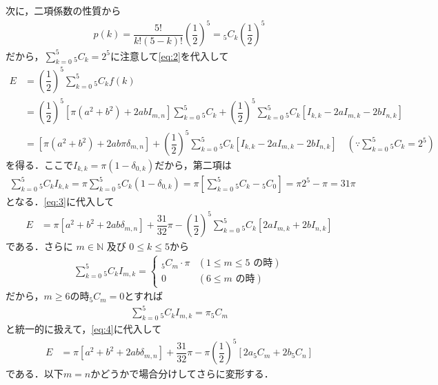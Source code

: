 \documentclass[../../main.tex]{subfiles}
\begin{document}
次に，二項係数の性質から
\begin{align}
  p(k)=\dfrac{5!}{k! (5-k)!} {\left( \dfrac{1}{2} \right)}^5  = {}_{5}C_{k}\left( \dfrac{1}{2} \right)^5
\end{align}
だから，$\sum_{k=0}^{5} {}_{5}C_{k}=2^5$に注意して\cref{eq:2}を代入して
\begin{align}
  E
  & = \left( \dfrac{1}{2} \right)^5 \sum_{k=0}^{5} {}_{5}C_{k} f(k) \\
  &= \left( \dfrac{1}{2} \right)^5 \left[\pi(a^2+b^2)+2ab I_{m,n}\right]\sum_{k=0}^{5} {}_{5}C_{k}
  + \left( \dfrac{1}{2} \right)^5 \sum_{k=0}^{5} {}_{5}C_{k}\left[I_{k,k}- 2a I_{m,k} - 2b I_{n,k}\right] \\
  &= \left[\pi(a^2+b^2)+2ab\pi \delta_{m,n} \right]
  + \left( \dfrac{1}{2} \right)^5 \sum_{k=0}^{5} {}_{5}C_{k}\left[I_{k,k}- 2a I_{m,k} - 2b I_{n,k}\right] \quad (\because \sum_{k=0}^{5} {}_{5}C_{k}=2^5) \label{eq:3}
\end{align}
を得る．ここで$I_{k,k}=\pi(1-\delta_{0,k})$だから，第二項は
\begin{align}
  \sum_{k=0}^{5} {}_{5}C_{k} I_{k,k}
  = \pi \sum_{k=0}^{5} {}_{5}C_{k} (1-\delta_{0,k})
  = \pi \left[ \sum_{k=0}^{5} {}_{5}C_{k} - {}_{5}C_{0}\right]
  = \pi 2^5 - \pi
  = 31\pi
\end{align}
となる．\cref{eq:3}に代入して
\begin{align}
  E
  &= \pi \left[a^2+b^2+2ab\delta_{m,n} \right] + \dfrac{31}{32}\pi
  - \left( \dfrac{1}{2} \right)^5 \sum_{k=0}^{5} {}_{5}C_{k}\left[2a I_{m,k} + 2b I_{n,k}\right] \label{eq:4}
\end{align}
である．さらに $m \in \mathbb{N}$ 及び $0 \le k \le 5$から
\begin{align}
  \sum_{k=0}^{5} {}_5C_k I_{m,k}
  =
  \begin{cases}
    {}_5C_m \cdot \pi & (1 \le m \le 5 \text{ の時}) \\
    0 & (6 \le m \text{ の時})
  \end{cases}
\end{align}
だから，$m \ge 6$の時${}_5C_m=0$とすれば
\begin{align}
  \sum_{k=0}^{5} {}_5C_k I_{m,k} = \pi {}_5C_m
\end{align}
と統一的に扱えて，\cref{eq:4}に代入して
\begin{align}
  E
  &= \pi\left[a^2+b^2+2ab \delta_{m,n}\right] + \dfrac{31}{32}\pi
  - \pi \left( \dfrac{1}{2} \right)^5 \left[2a {}_5C_m + 2b {}_5C_n \right] \label{eq:5}
\end{align}
である．以下$m=n$かどうかで場合分けしてさらに変形する．
\end{document}
